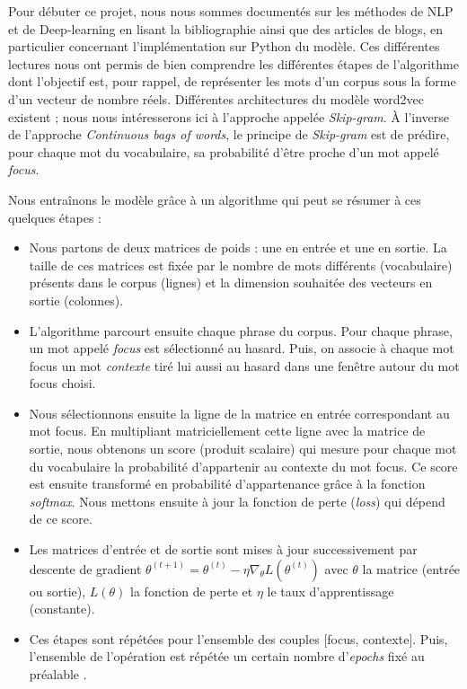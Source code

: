 \documentclass[11pt,french,french]{article}
\begin{document}
Pour débuter ce projet, nous nous sommes documentés sur les méthodes de
NLP et de Deep-learning en lisant la bibliographie ainsi que des
articles de blogs, en particulier concernant l'implémentation sur Python
du modèle. Ces différentes lectures nous ont permis de bien comprendre
les différentes étapes de l'algorithme dont l'objectif est, pour rappel,
de représenter les mots d'un corpus sous la forme d'un vecteur de nombre
réels. Différentes architectures du modèle word2vec existent ; nous nous
intéresserons ici à l'approche appelée \emph{Skip-gram}. À l'inverse de
l'approche \emph{Continuous bags of words}, le principe de
\emph{Skip-gram} est de prédire, pour chaque mot du vocabulaire, sa
probabilité d'être proche d'un mot appelé \emph{focus}.

Nous entraînons le modèle grâce à un algorithme qui peut se résumer à
ces quelques étapes :

\begin{itemize}
\item
  Nous partons de deux matrices de poids : une en entrée et une en
  sortie. La taille de ces matrices est fixée par le nombre de mots
  différents (vocabulaire) présents dans le corpus (lignes) et la
  dimension souhaitée des vecteurs en sortie (colonnes).
\item
  L'algorithme parcourt ensuite chaque phrase du corpus. Pour chaque
  phrase, un mot appelé \emph{focus} est sélectionné au hasard. Puis, on
  associe à chaque mot focus un mot \emph{contexte} tiré lui aussi au
  hasard dans une fenêtre autour du mot focus choisi.
\item
  Nous sélectionnons ensuite la ligne de la matrice en entrée
  correspondant au mot focus. En multipliant matriciellement cette ligne
  avec la matrice de sortie, nous obtenons un score (produit scalaire)
  qui mesure pour chaque mot du vocabulaire la probabilité d'appartenir
  au contexte du mot focus. Ce score est ensuite transformé en
  probabilité d'appartenance grâce à la fonction \emph{softmax}. Nous
  mettons ensuite à jour la fonction de perte (\emph{loss}) qui dépend
  de ce score.
\item
  Les matrices d'entrée et de sortie sont mises à jour successivement
  par descente de gradient
  \(\theta^{(t+1)} = \theta^{(t)} - \eta \nabla_\theta L(\theta^{(t)})\)
  avec \(\theta\) la matrice (entrée ou sortie), \(L(\theta)\) la
  fonction de perte et \(\eta\) le taux d'apprentissage (constante).
\item
  Ces étapes sont répétées pour l'ensemble des couples {[}focus,
  contexte{]}. Puis, l'ensemble de l'opération est répétée un certain
  nombre d'\emph{epochs} fixé au préalable .
\end{itemize}
\end{document}

